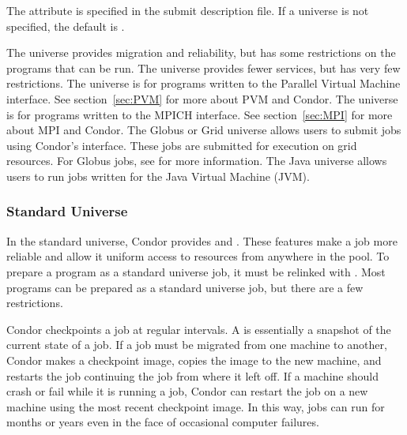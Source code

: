 The  attribute is specified in the submit description file.
If a universe is not specified, the default is .

The  universe provides migration and reliability, but has some
restrictions on the programs that can be run. 
The  universe provides fewer services, but has very few
restrictions.
The  universe is for programs written to the Parallel Virtual
Machine interface.  See section~\ref{sec:PVM} for more about PVM and Condor.
The  universe is for programs written to the MPICH interface.
See section~\ref{sec:MPI} for more about MPI and Condor.
The Globus or Grid universe allows users to submit 
jobs using Condor's interface.
These jobs are submitted for execution on grid resources.
For Globus jobs,
see  for more information.
The Java universe allows users to run jobs written for the
Java Virtual Machine (JVM).

\subsubsection{\label{sec:standard-universe}Standard Universe}

In the standard universe, Condor provides  and
.  These features make a job more reliable
and allow it uniform access to resources from anywhere in the pool.
To prepare a program as a standard universe job, it must be relinked
with .  Most programs can be prepared as a standard
universe job, but there are a few restrictions.

Condor checkpoints a job at regular intervals.
A  is essentially a snapshot of the current
state of a job. 
If a job must be migrated from one machine to another,
Condor makes a checkpoint image, copies the image to the new machine,
and restarts the job continuing the job from where it left off.
If a machine should
crash or fail while it is running a job, Condor can restart the job on
a new machine using the most recent checkpoint image.
In this way, jobs
can run for months or years even in the face of occasional computer failures.

